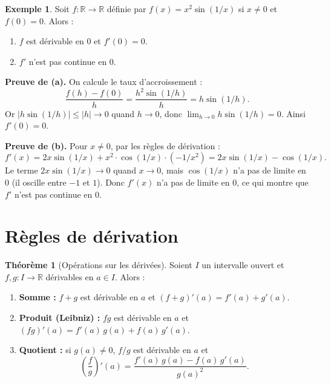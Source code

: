 \documentclass[12pt,a4paper,openany]{book}
\theoremstyle{definition}
\newtheorem{theoreme}{Théorème}[chapter]
\newtheorem{exemple}{Exemple}[chapter]
\newcommand{\R}{\mathbb{R}}
\begin{document}
\begin{exemple}\label{ex:x2-sin-1-sur-x}
Soit $f \colon \R \to \R$ définie par $f(x) = x^2 \sin(1/x)$ si $x \neq 0$ et $f(0) = 0$. Alors :
\begin{enumerate}[label=\textup{(\alph*)}]
  \item $f$ est dérivable en $0$ et $f'(0) = 0$.
  \item $f'$ n'est pas continue en $0$.
\end{enumerate}

\medskip
\textbf{Preuve de (a).} On calcule le taux d'accroissement :
\[
  \frac{f(h) - f(0)}{h} = \frac{h^2 \sin(1/h)}{h} = h \sin(1/h).
\]
Or $|h \sin(1/h)| \leqslant |h| \to 0$ quand $h \to 0$, donc $\lim_{h \to 0} h\sin(1/h) = 0$. Ainsi $f'(0) = 0$.

\textbf{Preuve de (b).} Pour $x \neq 0$, par les règles de dérivation :
\[
  f'(x) = 2x \sin(1/x) + x^2 \cdot \cos(1/x) \cdot (-1/x^2) = 2x\sin(1/x) - \cos(1/x).
\]
Le terme $2x\sin(1/x) \to 0$ quand $x \to 0$, mais $\cos(1/x)$ n'a pas de limite en $0$ (il oscille entre $-1$ et $1$). Donc $f'(x)$ n'a pas de limite en $0$, ce qui montre que $f'$ n'est pas continue en $0$.
\end{exemple}

\section{Règles de dérivation}\label{sec:regles-derivation}

\begin{theoreme}[Opérations sur les dérivées]\label{thm:regles-derivation}
Soient $I$ un intervalle ouvert et $f, g \colon I \to \R$ dérivables en $a \in I$. Alors :
\begin{enumerate}[label=\textup{(\roman*)}]
  \item \textbf{Somme :} $f + g$ est dérivable en $a$ et $(f + g)'(a) = f'(a) + g'(a)$.
  \item \textbf{Produit (Leibniz) :} $fg$ est dérivable en $a$ et $(fg)'(a) = f'(a)\,g(a) + f(a)\,g'(a)$.
  \item \textbf{Quotient :} si $g(a) \neq 0$, $f/g$ est dérivable en $a$ et
  \[
    \left(\frac{f}{g}\right)'(a) = \frac{f'(a)\,g(a) - f(a)\,g'(a)}{g(a)^2}.
  \]
\end{enumerate}
\end{theoreme}
\end{document}
